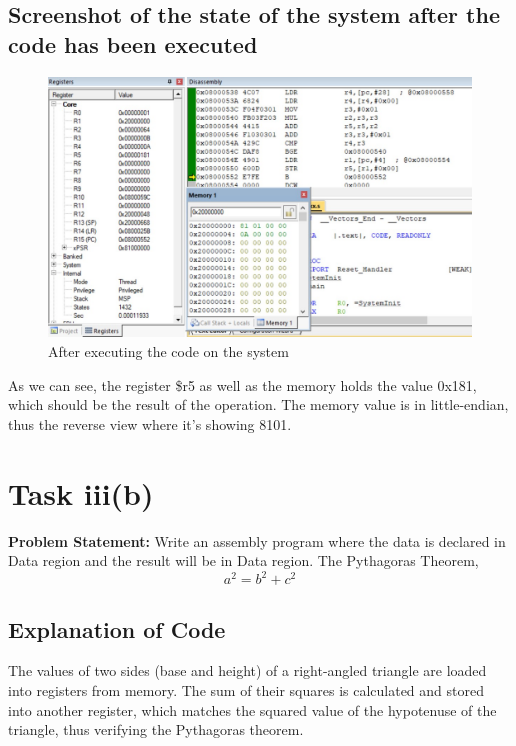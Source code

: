 \documentclass[footheight=20pt, footsepline, headheight=20pt, headsepline]{scrartcl}
\begin{document}
\subsection*{Screenshot of the state of the system after the code has been executed}
\begin{figure}[h!]
    \centering
    \includegraphics[scale=.7]{images/Task3a_After1.jpg}
    \caption{After executing the code on the system}
    \label{fig:after_task_3a}
\end{figure}
\FloatBarrier
As we can see, the register \$r5 as well as the memory holds the value 0x181, which should be the result of the operation. The memory value is in little-endian, thus the reverse view where it's showing 8101.








\FloatBarrier
{}
\section*{Task iii(b)}
\textbf{Problem Statement:} Write an assembly program where the data is declared in Data region and the result will be in Data region. The Pythagoras Theorem,\\
\[ a^2 =  b^2 + c^2\]
\subsection*{Explanation of Code}
The values of two sides (base and height) of a right-angled triangle are loaded into registers from memory. The sum of their squares is calculated and stored into another register, which matches the squared value of the hypotenuse of the triangle, thus verifying the Pythagoras theorem.\\
\end{document}
